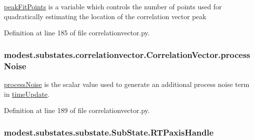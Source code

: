 \hyperlink{classmodest_1_1substates_1_1correlationvector_1_1CorrelationVector_af2be8d7129fd0453208af5268fdddc22}{peak\+Fit\+Points} is a variable which controls the number of points used for quadratically estimating the location of the correlation vector peak 



Definition at line 185 of file correlationvector.\+py.

\subsubsection[{\texorpdfstring{process\+Noise}{processNoise}}]{\setlength{\rightskip}{0pt plus 5cm}modest.\+substates.\+correlationvector.\+Correlation\+Vector.\+process\+Noise}\hypertarget{classmodest_1_1substates_1_1correlationvector_1_1CorrelationVector_ab1756128cdec161ea22557d756745195}{}\label{classmodest_1_1substates_1_1correlationvector_1_1CorrelationVector_ab1756128cdec161ea22557d756745195}


\hyperlink{classmodest_1_1substates_1_1correlationvector_1_1CorrelationVector_ab1756128cdec161ea22557d756745195}{process\+Noise} is the scalar value used to generate an additional process noise term in \hyperlink{classmodest_1_1substates_1_1correlationvector_1_1CorrelationVector_a59c13e5fa26ba27717494f687ec78ef8}{time\+Update}. 



Definition at line 189 of file correlationvector.\+py.

\subsubsection[{\texorpdfstring{R\+T\+Paxis\+Handle}{RTPaxisHandle}}]{\setlength{\rightskip}{0pt plus 5cm}modest.\+substates.\+substate.\+Sub\+State.\+R\+T\+Paxis\+Handle\hspace{0.3cm}{\ttfamily [inherited]}}\hypertarget{classmodest_1_1substates_1_1substate_1_1SubState_a497ccbb6658589b02568e87c6382222e}{}\label{classmodest_1_1substates_1_1substate_1_1SubState_a497ccbb6658589b02568e87c6382222e}


